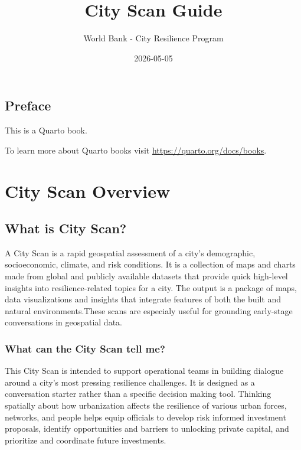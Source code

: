 \documentclass[
  letterpaper,
  DIV=11,
  numbers=noendperiod]{scrreprt}
\title{City Scan Guide}
\author{World Bank - City Resilience Program}
\date{2026-05-05}
\renewcommand*\contentsname{Table of contents}
\newcommand\contentsname{Table of contents}
\begin{document}
\maketitle

\renewcommand*\contentsname{Table of contents}
{
\setcounter{tocdepth}{2}
\tableofcontents
}


\chapter*{Preface}\label{preface}


This is a Quarto book.

To learn more about Quarto books visit
\url{https://quarto.org/docs/books}.

\part{City Scan Overview}

\chapter{What is City Scan?}\label{what-is-city-scan}

A City Scan is a rapid geospatial assessment of a city's demographic,
socioeconomic, climate, and risk conditions. It is a collection of maps
and charts made from global and publicly available datasets that provide
quick high-level insights into resilience-related topics for a city. The
output is a package of maps, data visualizations and insights that
integrate features of both the built and natural environments.These
scans are especialy useful for grounding early-stage conversations in
geospatial data.

\section{What can the City Scan tell
me?}\label{what-can-the-city-scan-tell-me}

This City Scan is intended to support operational teams in building
dialogue around a city's most pressing resilience challenges. It is
designed as a conversation starter rather than a specific decision
making tool. Thinking spatially about how urbanization affects the
resilience of various urban forces, networks, and people helps equip
officials to develop risk informed investment proposals, identify
opportunities and barriers to unlocking private capital, and prioritize
and coordinate future investments.
\end{document}
